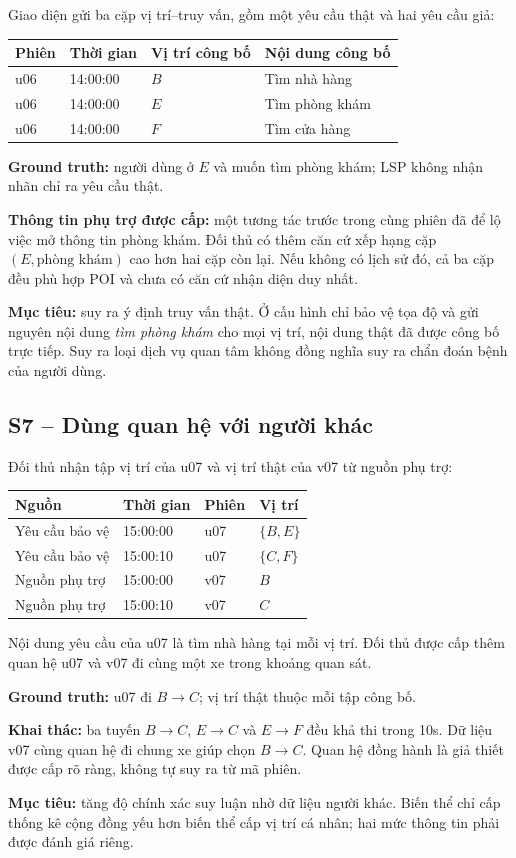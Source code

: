 Giao diện gửi ba cặp vị trí--truy vấn, gồm một yêu cầu thật và hai yêu cầu giả:
\begin{center}\small
\begin{tabular}{llll}
\toprule
Phiên & Thời gian & Vị trí công bố & Nội dung công bố\\
\midrule
u06 & 14:00:00 & $B$ & Tìm nhà hàng\\
u06 & 14:00:00 & $E$ & Tìm phòng khám\\
u06 & 14:00:00 & $F$ & Tìm cửa hàng\\
\bottomrule
\end{tabular}
\end{center}
\textbf{Ground truth:} người dùng ở $E$ và muốn tìm phòng khám; LSP không nhận nhãn chỉ ra yêu cầu thật.

\textbf{Thông tin phụ trợ được cấp:} một tương tác trước trong cùng phiên đã để lộ việc mở thông tin phòng khám. Đối thủ có thêm căn cứ xếp hạng cặp $(E,\text{phòng khám})$ cao hơn hai cặp còn lại. Nếu không có lịch sử đó, cả ba cặp đều phù hợp POI và chưa có căn cứ nhận diện duy nhất.

\textbf{Mục tiêu:} suy ra ý định truy vấn thật. Ở cấu hình chỉ bảo vệ tọa độ và gửi nguyên nội dung \emph{tìm phòng khám} cho mọi vị trí, nội dung thật đã được công bố trực tiếp. Suy ra loại dịch vụ quan tâm không đồng nghĩa suy ra chẩn đoán bệnh của người dùng.

\clearpage
\subsection{S7 -- Dùng quan hệ với người khác}
\label{example:s7}

Đối thủ nhận tập vị trí của u07 và vị trí thật của v07 từ nguồn phụ trợ:
\begin{center}\small
\begin{tabular}{llll}
\toprule
Nguồn & Thời gian & Phiên & Vị trí\\
\midrule
Yêu cầu bảo vệ & 15:00:00 & u07 & $\{B,E\}$\\
Yêu cầu bảo vệ & 15:00:10 & u07 & $\{C,F\}$\\
Nguồn phụ trợ & 15:00:00 & v07 & $B$\\
Nguồn phụ trợ & 15:00:10 & v07 & $C$\\
\bottomrule
\end{tabular}
\end{center}
Nội dung yêu cầu của u07 là tìm nhà hàng tại mỗi vị trí. Đối thủ được cấp thêm quan hệ u07 và v07 đi cùng một xe trong khoảng quan sát.

\textbf{Ground truth:} u07 đi $B\rightarrow C$; vị trí thật thuộc mỗi tập công bố.

\textbf{Khai thác:} ba tuyến $B\rightarrow C$, $E\rightarrow C$ và $E\rightarrow F$ đều khả thi trong 10s. Dữ liệu v07 cùng quan hệ đi chung xe giúp chọn $B\rightarrow C$. Quan hệ đồng hành là giả thiết được cấp rõ ràng, không tự suy ra từ mã phiên.

\textbf{Mục tiêu:} tăng độ chính xác suy luận nhờ dữ liệu người khác. Biến thể chỉ cấp thống kê cộng đồng yếu hơn biến thể cấp vị trí cá nhân; hai mức thông tin phải được đánh giá riêng.
